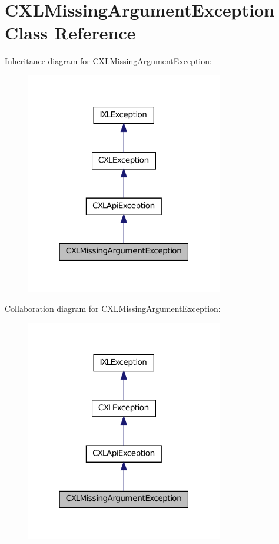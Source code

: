 \hypertarget{classCXLMissingArgumentException}{
\section{CXLMissingArgumentException Class Reference}
\label{classCXLMissingArgumentException}
}


Inheritance diagram for CXLMissingArgumentException:\nopagebreak
\begin{figure}[H]
\begin{center}
\leavevmode
\includegraphics[width=244pt]{classCXLMissingArgumentException__inherit__graph}
\end{center}
\end{figure}


Collaboration diagram for CXLMissingArgumentException:\nopagebreak
\begin{figure}[H]
\begin{center}
\leavevmode
\includegraphics[width=244pt]{classCXLMissingArgumentException__coll__graph}
\end{center}
\end{figure}


